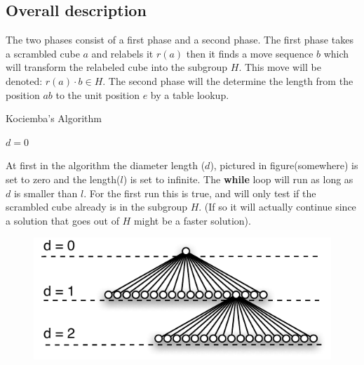 \subsection{Overall description}
\label{sub:overallDescription}
The two phases consist of a first phase and a second phase. 
The first phase takes a scrambled cube $a$ and relabels it $r(a)$ then it finds a move sequence $b$ which will transform the relabeled cube into the subgroup $H$. This move will be denoted: $r(a)\cdot{}b \in H$. The second phase will the determine the length from the position $ab$ to the unit position $e$ by a table lookup. 


\begin{algorithm}                     
\caption{Kociemba's Algorithm \cite{rokicki09}}          
\label{alg:kociemba}        
\begin{algorithmic}[1]
\STATE $d=0$
			\ENDIF
		\ENDIF
	\ENDFOR
\ENDWHILE
\end{algorithmic}
\end{algorithm}

At first in the algorithm the diameter length ($d$), pictured in figure(somewhere) is set to zero and the length($l$) is set to infinite. The \textbf{while} loop will run as long as $d$ is smaller than $l$. For the first run this is true, and will only test if the scrambled cube already is in the subgroup $H$. (If so it will actually continue since a solution that goes out of $H$ might be a faster solution). 

\begin{figure}[hb]
	\centering
		\includegraphics{input/pics/searchExpansion.pdf}
	\caption{}
	\label{fig:searchExpansion}
\end{figure}

